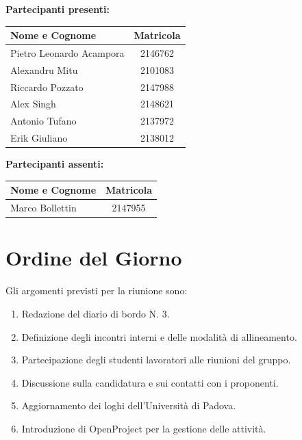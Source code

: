 \documentclass[a4paper, 11pt]{article}
\begin{document}
\vspace{0.5cm}
\textbf{Partecipanti presenti:} \\
\vspace{0.2cm}
\renewcommand{\arraystretch}{1.2}
\begin{tabularx}{0.8\textwidth}{|X|c|}
\hline
\textbf{Nome e Cognome} & \textbf{Matricola} \\ \hline
Pietro Leonardo Acampora & 2146762 \\ \hline
Alexandru Mitu & 2101083 \\ \hline
Riccardo Pozzato & 2147988 \\ \hline
Alex Singh & 2148621 \\ \hline
Antonio Tufano & 2137972 \\ \hline
Erik Giuliano & 2138012 \\ \hline
\end{tabularx}

\vspace{0.5cm}
\textbf{Partecipanti assenti:} \\
\vspace{0.2cm}
\renewcommand{\arraystretch}{1.2}
\begin{tabularx}{0.8\textwidth}{|X|c|}
\hline
\textbf{Nome e Cognome} & \textbf{Matricola} \\ \hline
Marco Bollettin & 2147955 \\ \hline
\end{tabularx}

\vspace{0.5cm}
\section{Ordine del Giorno}
Gli argomenti previsti per la riunione sono:
\begin{enumerate}
    \item Redazione del diario di bordo N. 3.
    \item Definizione degli incontri interni e delle modalità di allineamento.
    \item Partecipazione degli studenti lavoratori alle riunioni del gruppo.
    \item Discussione sulla candidatura e sui contatti con i proponenti.
    \item Aggiornamento dei loghi dell'Università di Padova.
    \item Introduzione di OpenProject per la gestione delle attività.
\end{enumerate}
\end{document}
